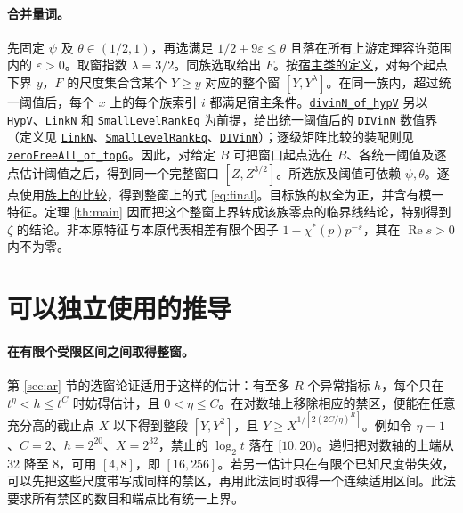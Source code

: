 \documentclass[UTF8,fontset=none,a4paper,11pt]{ctexart}
\theoremstyle{definition}
\newcommand{\re}{\operatorname{Re}}\newcommand{\e}{\varepsilon}
\newcommand{\src}[3]{\href{https://github.com/leanprover-community/riemann-hypothesis/blob/23aebbb302010b292314d406aa97f7901d698634/src/#1.lean\#L#2}{#3}}
\begin{document}
\paragraph{合并量词。}
先固定 $\psi$ 及 $\theta\in(1/2,1)$，再选满足 $1/2+9\e\le\theta$ 且落在所有上游定理容许范围内的 $\e>0$。取窗指数 $\lambda=3/2$。同族选取给出 $F$。按\src{Development/AutomorphicArithmetic/CharacterBoxes/Supply}{22}{宿主类的定义}，对每个起点下界 $y$，$F$ 的尺度集合含某个 $Y\ge y$ 对应的整个窗 $[Y,Y^\lambda]$。在同一族内，超过统一阈值后，每个 $x$ 上的每个族索引 $i$ 都满足宿主条件。\src{Development/AutomorphicArithmetic/CharacterBoxes/DivinNOfHypV}{117}{\texttt{divinN\_of\_hypV}} 另以 \texttt{HypV}、\texttt{LinkN} 和 \texttt{SmallLevelRankEq} 为前提，给出统一阈值后的 \texttt{DIVinN} 数值界（定义见 \src{Formalism/SharpRestriction/GlobalTheoremInputs}{45}{\texttt{LinkN}}、\src{Formalism/SharpRestriction/GlobalTheoremInputs}{52}{\texttt{SmallLevelRankEq}}、\src{Formalism/SharpRestriction/GlobalTheoremInputs}{62}{\texttt{DIVinN}}）；逐级矩阵比较的装配则见 \src{Development/AutomorphicArithmetic/CharacterBoxes/ZeroFreeAllOfTopG}{26}{\texttt{zeroFreeAll\_of\_topG}}。因此，对给定 $B$ 可把窗口起点选在 $B$、各统一阈值及逐点估计阈值之后，得到同一个完整窗口 $[Z,Z^{3/2}]$。所选族及阈值可依赖 $\psi,\theta$。逐点使用\src{Development/AutomorphicArithmetic/PrimitiveCosets/LevelGmLeOnFamilyScales}{28}{族上的比较}，得到整窗上的式 \eqref{eq:final}。目标族的权全为正，并含有模一特征。定理 \ref{th:main} 因而把这个整窗上界转成该族零点的临界线结论，特别得到 $\zeta$ 的结论。非本原特征与本原代表相差有限个因子 $1-\chi^*(p)p^{-s}$，其在 $\re s>0$ 内不为零。

\section{可以独立使用的推导}\label{sec:transfer}

\paragraph{在有限个受限区间之间取得整窗。}
第 \ref{sec:ar} 节的选窗论证适用于这样的估计：有至多 $R$ 个异常指标 $h$，每个只在 $t^\eta<h\le t^C$ 时妨碍估计，且 $0<\eta\le C$。在对数轴上移除相应的禁区，便能在任意充分高的截止点 $X$ 以下得到整段 $[Y,Y^2]$，且 $Y\ge X^{1/[2(2C/\eta)^R]}$。例如令 $\eta=1$、$C=2$、$h=2^{20}$、$X=2^{32}$，禁止的 $\log_2 t$ 落在 $[10,20)$。递归把对数轴的上端从 $32$ 降至 $8$，可用 $[4,8]$，即 $[16,256]$。若另一估计只在有限个已知尺度带失效，可以先把这些尺度带写成同样的禁区，再用此法同时取得一个连续适用区间。此法要求所有禁区的数目和端点比有统一上界。
\end{document}
